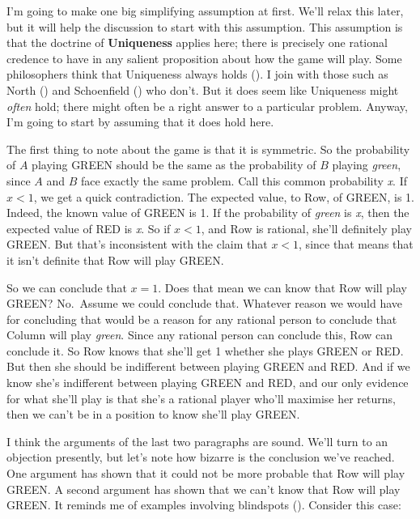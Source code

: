 \documentclass[
  10pt,
  letterpaper,
  DIV=11,
  numbers=noendperiod,
  twoside]{scrartcl}
\begin{document}
I'm going to make one big simplifying assumption at first. We'll relax
this later, but it will help the discussion to start with this
assumption. This assumption is that the doctrine of \textbf{Uniqueness}
applies here; there is precisely one rational credence to have in any
salient proposition about how the game will play. Some philosophers
think that Uniqueness always holds (). I join with those such as North ()
and Schoenfield () who don't. But it
does seem like Uniqueness might \emph{often} hold; there might often be
a right answer to a particular problem. Anyway, I'm going to start by
assuming that it does hold here.

The first thing to note about the game is that it is symmetric. So the
probability of \(A\) playing GREEN should be the same as the probability
of \(B\) playing \emph{green}, since \(A\) and \(B\) face exactly the
same problem. Call this common probability \emph{x}. If \(x < 1\), we
get a quick contradiction. The expected value, to Row, of GREEN, is 1.
Indeed, the known value of GREEN is 1. If the probability of
\emph{green} is \emph{x}, then the expected value of RED is \emph{x}. So
if \(x < 1\), and Row is rational, she'll definitely play GREEN. But
that's inconsistent with the claim that \(x < 1\), since that means that
it isn't definite that Row will play GREEN.

So we can conclude that \(x = 1\). Does that mean we can know that Row
will play GREEN? No.~Assume we could conclude that. Whatever reason we
would have for concluding that would be a reason for any rational person
to conclude that Column will play \emph{green}. Since any rational
person can conclude this, Row can conclude it. So Row knows that she'll
get 1 whether she plays GREEN or RED. But then she should be indifferent
between playing GREEN and RED. And if we know she's indifferent between
playing GREEN and RED, and our only evidence for what she'll play is
that she's a rational player who'll maximise her returns, then we can't
be in a position to know she'll play GREEN.

I think the arguments of the last two paragraphs are sound. We'll turn
to an objection presently, but let's note how bizarre is the conclusion
we've reached. One argument has shown that it could not be more probable
that Row will play GREEN. A second argument has shown that we can't know
that Row will play GREEN. It reminds me of examples involving blindspots
(). Consider this case:
\end{document}
